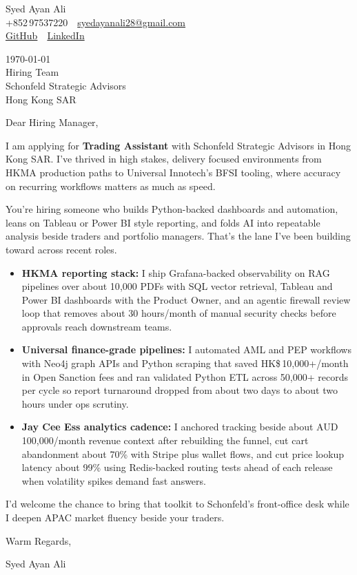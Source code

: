 \documentclass[11pt,a4paper]{article}
\begin{document}
\noindent
Syed Ayan Ali\\
+852\,97537220 \,\textbar\, \href{mailto:syedayanali28@gmail.com}{syedayanali28@gmail.com}\\
\href{https://github.com/syedayanali28}{GitHub} \,\textbar\, \href{https://www.linkedin.com/in/syedayanali/}{LinkedIn}

\vspace{1em}

\noindent
\today\\[0.8em]
Hiring Team\\
Schonfeld Strategic Advisors\\
Hong Kong SAR

\vspace{1em}

Dear Hiring Manager,

I am applying for \textbf{Trading Assistant} with Schonfeld Strategic Advisors in Hong Kong SAR. I've thrived in high stakes, delivery focused environments from HKMA production paths to Universal Innotech's BFSI tooling, where accuracy on recurring workflows matters as much as speed.

You're hiring someone who builds Python-backed dashboards and automation, leans on Tableau or Power BI style reporting, and folds AI into repeatable analysis beside traders and portfolio managers. That's the lane I've been building toward across recent roles.

\begin{itemize}
\item \textbf{HKMA reporting stack:} I ship Grafana-backed observability on RAG pipelines over about 10{,}000 PDFs with SQL vector retrieval, Tableau and Power BI dashboards with the Product Owner, and an agentic firewall review loop that removes about 30 hours/month of manual security checks before approvals reach downstream teams.

\item \textbf{Universal finance-grade pipelines:} I automated AML and PEP workflows with Neo4j graph APIs and Python scraping that saved HK\$\,10{,}000+/month in Open Sanction fees and ran validated Python ETL across 50{,}000+ records per cycle so report turnaround dropped from about two days to about two hours under ops scrutiny.

\item \textbf{Jay Cee Ess analytics cadence:} I anchored tracking beside about AUD\,100{,}000/month revenue context after rebuilding the funnel, cut cart abandonment about 70\% with Stripe plus wallet flows, and cut price lookup latency about 99\% using Redis-backed routing tests ahead of each release when volatility spikes demand fast answers.
\end{itemize}

I'd welcome the chance to bring that toolkit to Schonfeld's front-office desk while I deepen APAC market fluency beside your traders.

\vspace{1em}

Warm Regards,

\vspace{0.5em}

Syed Ayan Ali
\end{document}
